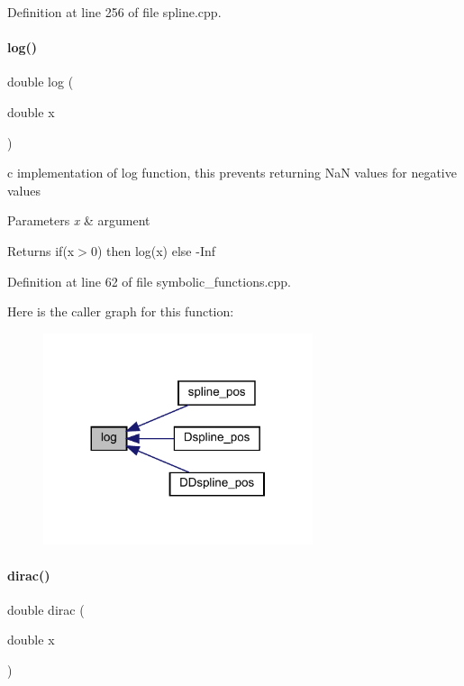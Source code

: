 Definition at line 256 of file spline.\+cpp.

\mbox{\label{namespaceamici_adb302c9aafbaa5e180d9f60ee954bb82}} 
\paragraph{\texorpdfstring{log()}{log()}}
{\footnotesize\ttfamily double log (\begin{DoxyParamCaption}\item[{double}]{x }\end{DoxyParamCaption})}

c implementation of log function, this prevents returning NaN values for negative values


\begin{DoxyParams}{Parameters}
{\em x} & argument \\
\hline
\end{DoxyParams}
\begin{DoxyReturn}{Returns}
if(x$>$0) then log(x) else -\/\+Inf 
\end{DoxyReturn}


Definition at line 62 of file symbolic\+\_\+functions.\+cpp.

Here is the caller graph for this function\+:
\nopagebreak
\begin{figure}[H]
\begin{center}
\leavevmode
\includegraphics[width=224pt]{namespaceamici_adb302c9aafbaa5e180d9f60ee954bb82_icgraph}
\end{center}
\end{figure}
\mbox{\label{namespaceamici_a30a33546875b9dd1a63c29312b316f7e}} 
\paragraph{\texorpdfstring{dirac()}{dirac()}}
{\footnotesize\ttfamily double dirac (\begin{DoxyParamCaption}\item[{double}]{x }\end{DoxyParamCaption})}

